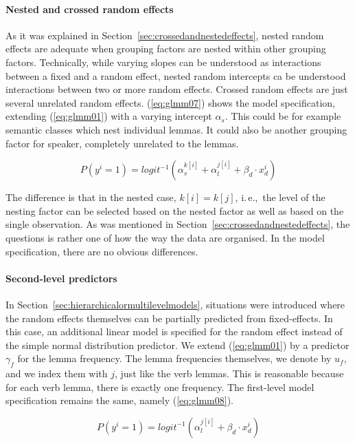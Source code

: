 \documentclass[a4paper,12pt]{article}
\newcommand{\ie}{i.\,e.,\ }
\begin{document}
\paragraph{Nested and crossed random effects}

As it was explained in Section~\ref{sec:crossedandnestedeffects}, nested random effects are adequate when grouping factors are nested within other grouping factors.
Technically, while varying slopes can be understood as interactions between a fixed and a random effect, nested random intercepts ca be understood interactions between two or more random effects.
Crossed random effects are just several unrelated random effects.
(\ref{eq:glmm07}) shows the model specification, extending (\ref{eq:glmm01}) with a varying intercept $\alpha_s$.
This could be for example semantic classes which nest individual lemmas.
It could also be another grouping factor for speaker, completely unrelated to the lemmas.

\begin{equation}
  P(y^i=1)=logit^{-1}(\alpha_{s}^{k[i]}+\alpha_{l}^{j[i]}+\beta_d\cdot x_d^i)
  \label{eq:glmm07}
\end{equation}

The difference is that in the nested case, $k[i]=k[j]$, \ie the level of the nesting factor can be selected based on the nested factor as well as based on the single observation.
As was mentioned in Section~\ref{sec:crossedandnestedeffects}, the questions is rather one of how the way the data are organised.
In the model specification, there are no obvious differences.

\paragraph{Second-level predictors}

In Section~\ref{sec:hierarchicalormultilevelmodels}, situations were introduced where the random effects themselves can be partially predicted from fixed-effects.
In this case, an additional linear model is specified for the random effect instead of the simple normal distribution predictor.
We extend (\ref{eq:glmm01}) by a predictor $\gamma_f$ for the lemma frequency.
The lemma frequencies themselves, we denote by $u_f$, and we index them with $j$, just like the verb lemmas.
This is reasonable because for each verb lemma, there is exactly one frequency.
The first-level model specification remains the same, namely (\ref{eq:glmm08}).

\begin{equation}
  P(y^i=1)=logit^{-1}(\alpha_{l}^{j[i]}+\beta_d\cdot x_d^i)
  \label{eq:glmm08}
\end{equation}
\end{document}
